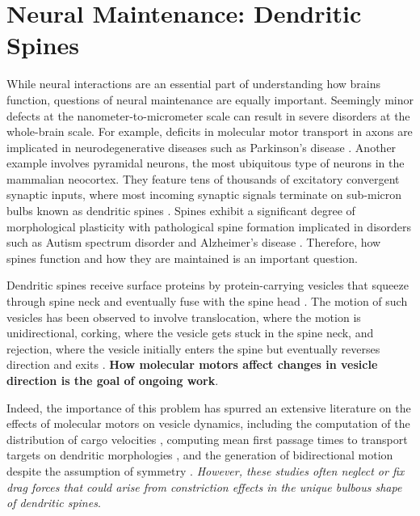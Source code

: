 \documentclass[a4paper,11pt]{article}
\begin{document}
\section{Neural Maintenance: Dendritic Spines} \label{sec:maintenance}

While neural interactions are an essential part of understanding how brains function, questions of neural maintenance are equally important. Seemingly minor defects at the nanometer-to-micrometer scale can result in severe disorders at the whole-brain scale. For example, deficits in molecular motor transport in axons are implicated in neurodegenerative diseases such as Parkinson's disease \cite{millecamps2013axonal}. Another example involves pyramidal neurons, the most ubiquitous type of neurons in the mammalian neocortex. They feature tens of thousands of excitatory convergent synaptic inputs, where most incoming synaptic signals terminate on sub-micron bulbs known as dendritic spines \cite{nimchinsky2002structure}. Spines exhibit a significant degree of morphological plasticity \cite{kasai2010structural} with pathological spine formation implicated in disorders such as Autism spectrum disorder and Alzheimer's disease \cite{penzes2011dendritic}. Therefore, how spines function and how they are maintained is an important question.

Dendritic spines receive surface proteins by protein-carrying vesicles that squeeze through spine neck and eventually fuse with the spine head \cite{da2015positioning}. The motion of such vesicles has been observed to involve translocation, where the motion is unidirectional, corking, where the vesicle gets stuck in the spine neck, and rejection, where the vesicle initially enters the spine but eventually reverses direction and exits \cite{park2006plasticity}. \textbf{How molecular motors affect changes in vesicle direction is the goal of ongoing work}.

Indeed, the importance of this problem has spurred an extensive literature on the effects of molecular motors on vesicle dynamics, including the computation of the distribution of cargo velocities \cite{kunwar2011mechanical}, computing mean first passage times to transport targets on dendritic morphologies \cite{bressloff2013metastability}, and the generation of bidirectional motion despite the assumption of symmetry \cite{portet2019deciphering}. \textit{However, these studies often neglect or fix drag forces that could arise from constriction effects in the unique bulbous shape of dendritic spines}.
\end{document}

